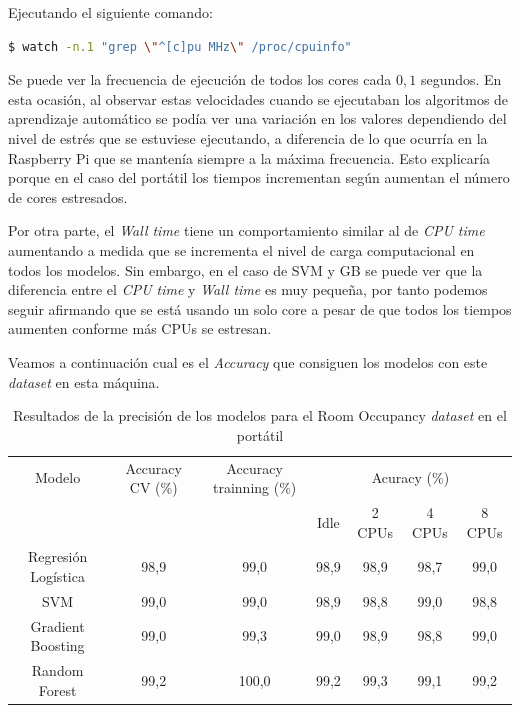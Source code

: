 \documentclass[a4paper, 12pt]{book}
\begin{document}
Ejecutando el siguiente comando: 

\begin{lstlisting}[language=bash, showstringspaces=false]
  $ watch -n.1 "grep \"^[c]pu MHz\" /proc/cpuinfo"
\end{lstlisting}

Se puede ver la frecuencia de ejecución de todos los cores cada $0,1$ segundos. En esta ocasión, al observar estas velocidades cuando se ejecutaban los algoritmos de aprendizaje automático se podía ver una variación en los valores dependiendo del nivel de estrés que se estuviese ejecutando, a diferencia de lo que ocurría en la Raspberry Pi que se mantenía siempre a la máxima frecuencia. Esto explicaría porque en el caso del portátil los tiempos incrementan según aumentan el número de cores estresados. 

Por otra parte, el \textit{Wall time} tiene un comportamiento similar al de \textit{CPU time} aumentando a medida que se incrementa el nivel de carga computacional en todos los modelos. Sin embargo, en el caso de SVM y GB se puede ver que la diferencia entre el \textit{CPU time} y \textit{Wall time} es muy pequeña, por tanto podemos seguir afirmando que se está usando un solo core a pesar de que todos los tiempos aumenten conforme más CPUs se estresan.

Veamos a continuación cual es el \textit{Accuracy} que consiguen los modelos con este \textit{dataset} en esta máquina.\\
\begin{table}[htb]
\renewcommand{\arraystretch}{1.5}
\begin{adjustbox}{width=\textwidth}
\centering
    \begin{tabular}{c  c  c  c  c  c  c}
    \hline
    Modelo & Accuracy CV (\%) & Accuracy trainning (\%) & \multicolumn{4}{c}{Acuracy (\%)} \\
    \cline{4-7}
      &  &   &  Idle & 2 CPUs & 4 CPUs & 8 CPUs \\
     \hline
     Regresión Logística & 98,9 & 99,0 & 98,9 & 98,9 & 98,7 & 99,0\\
     SVM & 99,0 & 99,0 & 98,9 & 98,8 & 99,0 & 98,8\\
     Gradient Boosting & 99,0 & 99,3 & 99,0 & 98,9 & 98,8 & 99,0\\
     Random Forest & 99,2 & 100,0 & 99,2 & 99,3 & 99,1 & 99,2\\
    \hline
    \end{tabular}
\end{adjustbox}
\caption{Resultados de la precisión de los modelos para el Room Occupancy \textit{dataset} en el portátil}
\label{tab:acc_Occpc}
\end{table}
\end{document}
